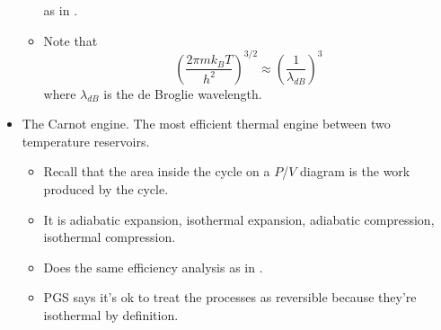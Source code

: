 \documentclass[../notes.tex]{subfiles}
\begin{document}
\begin{itemize}
\begin{itemize}
        as in \textcite{bib:McQuarrieSimon}.
        \item Note that
        \begin{equation*}
            \left( \frac{2\pi mk_BT}{h^2} \right)^{3/2} \approx \left( \frac{1}{\lambda_{dB}} \right)^3
        \end{equation*}
        where $\lambda_{dB}$ is the de Broglie wavelength.
    \end{itemize}
    \item The Carnot engine. The most efficient thermal engine between two temperature reservoirs.
    \begin{itemize}
        \item Recall that the area inside the cycle on a $P$/$V$ diagram is the work produced by the cycle.
        \item It is adiabatic expansion, isothermal expansion, adiabatic compression, isothermal compression.
        \item Does the same efficiency analysis as in \textcite{bib:McQuarrieSimon}.
        \item PGS says it's ok to treat the processes as reversible because they're isothermal by definition.
    \end{itemize}
\end{itemize}
\end{document}
